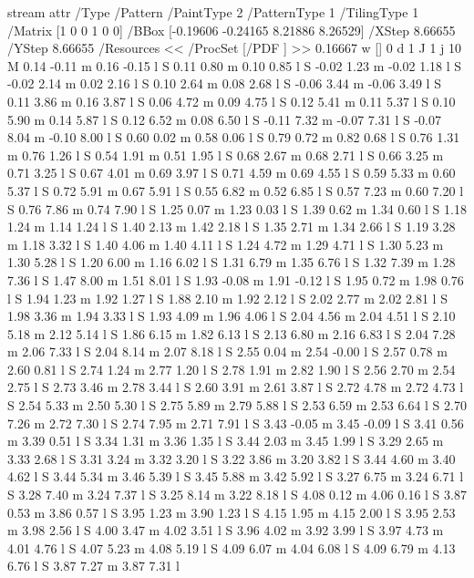 \immediate\pdfobj stream attr {/Type /Pattern
/PaintType 2 /PatternType 1 /TilingType 1
/Matrix [1 0 0 1 0 0]
/BBox [-0.19606 -0.24165 8.21886 8.26529]
/XStep 8.66655
/YStep 8.66655
/Resources << /ProcSet [/PDF ] >> } {
0.16667 w
[] 0 d
1 J
1 j
10 M
0.14 -0.11 m
0.16 -0.15 l
S
0.11 0.80 m
0.10 0.85 l
S
-0.02 1.23 m
-0.02 1.18 l
S
-0.02 2.14 m
0.02 2.16 l
S
0.10 2.64 m
0.08 2.68 l
S
-0.06 3.44 m
-0.06 3.49 l
S
0.11 3.86 m
0.16 3.87 l
S
0.06 4.72 m
0.09 4.75 l
S
0.12 5.41 m
0.11 5.37 l
S
0.10 5.90 m
0.14 5.87 l
S
0.12 6.52 m
0.08 6.50 l
S
-0.11 7.32 m
-0.07 7.31 l
S
-0.07 8.04 m
-0.10 8.00 l
S
0.60 0.02 m
0.58 0.06 l
S
0.79 0.72 m
0.82 0.68 l
S
0.76 1.31 m
0.76 1.26 l
S
0.54 1.91 m
0.51 1.95 l
S
0.68 2.67 m
0.68 2.71 l
S
0.66 3.25 m
0.71 3.25 l
S
0.67 4.01 m
0.69 3.97 l
S
0.71 4.59 m
0.69 4.55 l
S
0.59 5.33 m
0.60 5.37 l
S
0.72 5.91 m
0.67 5.91 l
S
0.55 6.82 m
0.52 6.85 l
S
0.57 7.23 m
0.60 7.20 l
S
0.76 7.86 m
0.74 7.90 l
S
1.25 0.07 m
1.23 0.03 l
S
1.39 0.62 m
1.34 0.60 l
S
1.18 1.24 m
1.14 1.24 l
S
1.40 2.13 m
1.42 2.18 l
S
1.35 2.71 m
1.34 2.66 l
S
1.19 3.28 m
1.18 3.32 l
S
1.40 4.06 m
1.40 4.11 l
S
1.24 4.72 m
1.29 4.71 l
S
1.30 5.23 m
1.30 5.28 l
S
1.20 6.00 m
1.16 6.02 l
S
1.31 6.79 m
1.35 6.76 l
S
1.32 7.39 m
1.28 7.36 l
S
1.47 8.00 m
1.51 8.01 l
S
1.93 -0.08 m
1.91 -0.12 l
S
1.95 0.72 m
1.98 0.76 l
S
1.94 1.23 m
1.92 1.27 l
S
1.88 2.10 m
1.92 2.12 l
S
2.02 2.77 m
2.02 2.81 l
S
1.98 3.36 m
1.94 3.33 l
S
1.93 4.09 m
1.96 4.06 l
S
2.04 4.56 m
2.04 4.51 l
S
2.10 5.18 m
2.12 5.14 l
S
1.86 6.15 m
1.82 6.13 l
S
2.13 6.80 m
2.16 6.83 l
S
2.04 7.28 m
2.06 7.33 l
S
2.04 8.14 m
2.07 8.18 l
S
2.55 0.04 m
2.54 -0.00 l
S
2.57 0.78 m
2.60 0.81 l
S
2.74 1.24 m
2.77 1.20 l
S
2.78 1.91 m
2.82 1.90 l
S
2.56 2.70 m
2.54 2.75 l
S
2.73 3.46 m
2.78 3.44 l
S
2.60 3.91 m
2.61 3.87 l
S
2.72 4.78 m
2.72 4.73 l
S
2.54 5.33 m
2.50 5.30 l
S
2.75 5.89 m
2.79 5.88 l
S
2.53 6.59 m
2.53 6.64 l
S
2.70 7.26 m
2.72 7.30 l
S
2.74 7.95 m
2.71 7.91 l
S
3.43 -0.05 m
3.45 -0.09 l
S
3.41 0.56 m
3.39 0.51 l
S
3.34 1.31 m
3.36 1.35 l
S
3.44 2.03 m
3.45 1.99 l
S
3.29 2.65 m
3.33 2.68 l
S
3.31 3.24 m
3.32 3.20 l
S
3.22 3.86 m
3.20 3.82 l
S
3.44 4.60 m
3.40 4.62 l
S
3.44 5.34 m
3.46 5.39 l
S
3.45 5.88 m
3.42 5.92 l
S
3.27 6.75 m
3.24 6.71 l
S
3.28 7.40 m
3.24 7.37 l
S
3.25 8.14 m
3.22 8.18 l
S
4.08 0.12 m
4.06 0.16 l
S
3.87 0.53 m
3.86 0.57 l
S
3.95 1.23 m
3.90 1.23 l
S
4.15 1.95 m
4.15 2.00 l
S
3.95 2.53 m
3.98 2.56 l
S
4.00 3.47 m
4.02 3.51 l
S
3.96 4.02 m
3.92 3.99 l
S
3.97 4.73 m
4.01 4.76 l
S
4.07 5.23 m
4.08 5.19 l
S
4.09 6.07 m
4.04 6.08 l
S
4.09 6.79 m
4.13 6.76 l
S
3.87 7.27 m
3.87 7.31 l
}
